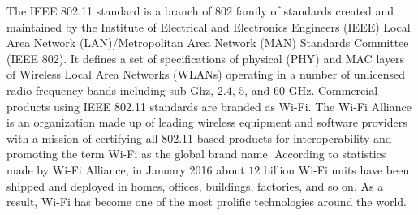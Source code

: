 The IEEE 802.11 standard is a branch of 802 family of standards created and maintained by the Institute of Electrical and Electronics Engineers (IEEE) Local Area Network (LAN)/Metropolitan Area Network (MAN) Standards Committee (IEEE 802). It defines a set of specifications of physical (PHY) and MAC layers of Wireless Local Area Networks (WLANs) operating in a number of unlicensed radio frequency bands including sub-Ghz, $2.4$, $5$, and $60$ GHz. Commercial products using IEEE 802.11 standards are branded as Wi-Fi. The Wi-Fi Alliance is an organization made up of leading wireless equipment and software providers with a mission of certifying all 802.11-based products for interoperability and promoting the term Wi-Fi as the global brand name. According to statistics made by Wi-Fi Alliance, in January 2016 about $12$ billion Wi-Fi units have been shipped and deployed in homes, offices, buildings, factories, and so on. As a result, Wi-Fi has become one of the most prolific technologies around the world. 

